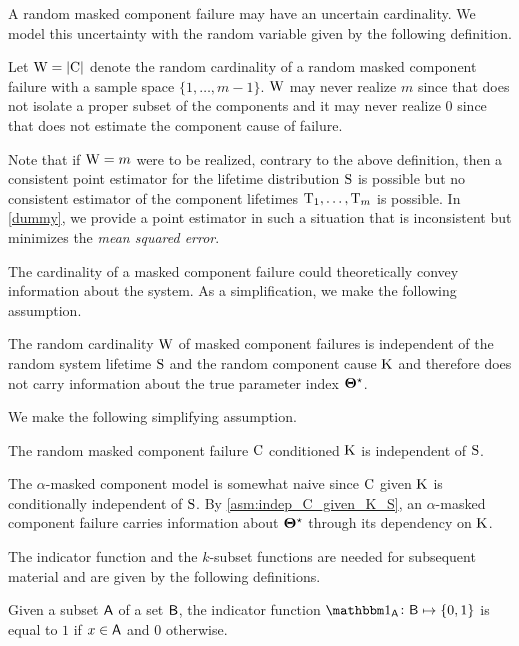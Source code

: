 \documentclass[
    11pt,
    extrafontsizes,
    article,
    oldfontcommands,
    final,
    oneside,
    openany,
    hidelinks]{memoir}
\begin{document}
A random masked component failure may have an uncertain cardinality.
We model this uncertainty with the random variable given by the following definition.
\begin{definition}
\label{def:rv_W}
Let $\mathrm{W} = \lvert\mathrm{C}\rvert$ denote the random cardinality of a random masked component failure with a sample space $\{1,\ldots,m-1\}$.
$\mathrm{W}$ may never realize $m$ since that does not isolate a proper subset of the components and it may never realize $0$ since that does not estimate the component cause of failure.
\end{definition}
Note that if $\mathrm{W}=m$ were to be realized, contrary to the above definition, then a consistent point estimator for the lifetime distribution $\mathrm{S}$ is possible but no consistent estimator of the component lifetimes $\mathrm{T}_1,\ldots,\mathrm{T}_m$ is possible.
In \cref{dummy}, we provide a point estimator in such a situation that is inconsistent but minimizes the \emph{mean squared error}.

The cardinality of a masked component failure could theoretically convey information about the system.
As a simplification, we make the following assumption.
\begin{assumption}
\label{asm:indep_W_S}
The random cardinality $\mathrm{W}$ of masked component failures is independent of the random system lifetime $\mathrm{S}$ and the random component cause $\mathrm{K}$ and therefore does not carry information about the true parameter index ${\boldsymbol{\Theta}}^{\star}$.
\end{assumption}

We make the following simplifying assumption.
\begin{assumption}
\label{asm:indep_C_given_K_S}
The random masked component failure $\mathrm{C}$ conditioned $\mathrm{K}$ is independent of $\mathrm{S}$.
\end{assumption}
The $\alpha$-masked component model is somewhat naive since $\mathrm{C}$ given $\mathrm{K}$ is conditionally independent of $\mathrm{S}$.
By \cref{asm:indep_C_given_K_S}, an $\alpha$-masked component failure carries information about ${\boldsymbol{\Theta}}^{\star}$ through its dependency on $\mathrm{K}$.

The indicator function and the $k$-subset functions are needed for subsequent material and are given by the following definitions.
\begin{definition}
	Given a subset $\Set{A}$ of a set $\Set{B}$, the indicator function $\SetIndicator{\Set{A}} \colon \Set{B} \mapsto \{0,1\}$
	is equal to $1$ if $x \in \Set{A}$ and $0$ otherwise.
\end{definition}
\end{document}
